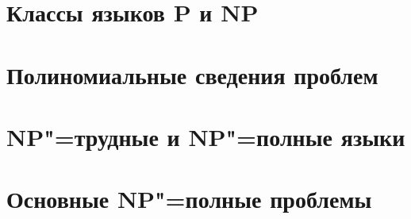 \documentclass{Exams}
\begin{document}
\section{Классы языков P и NP}


\section{Полиномиальные сведения проблем}


\section{NP"=трудные и NP"=полные языки}


\section{Основные NP"=полные проблемы}

\end{document}
